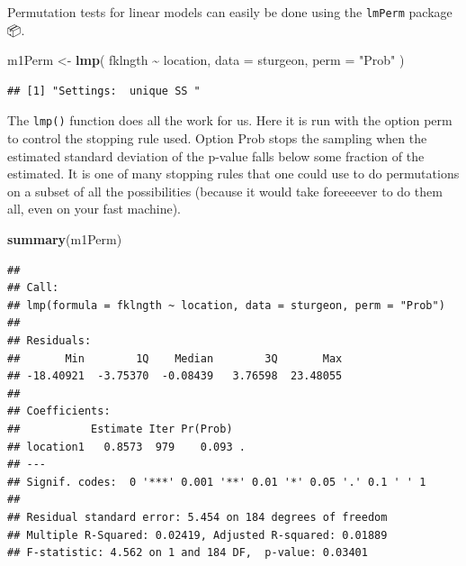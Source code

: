 \documentclass[
  12pt,
]{book}
\newenvironment{Shaded}{\begin{snugshade}}{\end{snugshade}}
\newcommand{\DataTypeTok}[1]{\textcolor[rgb]{0.13,0.29,0.53}{#1}}
\newcommand{\KeywordTok}[1]{\textcolor[rgb]{0.13,0.29,0.53}{\textbf{#1}}}
\newcommand{\NormalTok}[1]{#1}
\newcommand{\OperatorTok}[1]{\textcolor[rgb]{0.81,0.36,0.00}{\textbf{#1}}}
\newcommand{\StringTok}[1]{\textcolor[rgb]{0.31,0.60,0.02}{#1}}
\begin{document}
Permutation tests for linear models can easily be done using the \texttt{lmPerm} package 📦.

\begin{Shaded}
\begin{Highlighting}[]
\NormalTok{m1Perm \textless{}{-}}\StringTok{ }\KeywordTok{lmp}\NormalTok{(}
\NormalTok{  fklngth }\OperatorTok{\textasciitilde{}}\StringTok{ }\NormalTok{location,}
  \DataTypeTok{data =}\NormalTok{ sturgeon,}
  \DataTypeTok{perm =} \StringTok{"Prob"}
\NormalTok{)}
\end{Highlighting}
\end{Shaded}

\begin{verbatim}
## [1] "Settings:  unique SS "
\end{verbatim}

The \texttt{lmp()} function does all the work for us. Here it is run with the option perm to control the stopping rule used. Option Prob stops the sampling when the estimated standard deviation of the p-value falls below some fraction of the estimated. It is one of many stopping rules that one could use to do permutations on a subset of all the possibilities (because it would take foreeeever to do them all, even on your fast machine).

\begin{Shaded}
\begin{Highlighting}[]
\KeywordTok{summary}\NormalTok{(m1Perm)}
\end{Highlighting}
\end{Shaded}

\begin{verbatim}
## 
## Call:
## lmp(formula = fklngth ~ location, data = sturgeon, perm = "Prob")
## 
## Residuals:
##       Min        1Q    Median        3Q       Max 
## -18.40921  -3.75370  -0.08439   3.76598  23.48055 
## 
## Coefficients:
##           Estimate Iter Pr(Prob)  
## location1   0.8573  979    0.093 .
## ---
## Signif. codes:  0 '***' 0.001 '**' 0.01 '*' 0.05 '.' 0.1 ' ' 1
## 
## Residual standard error: 5.454 on 184 degrees of freedom
## Multiple R-Squared: 0.02419, Adjusted R-squared: 0.01889 
## F-statistic: 4.562 on 1 and 184 DF,  p-value: 0.03401
\end{verbatim}
\end{document}
